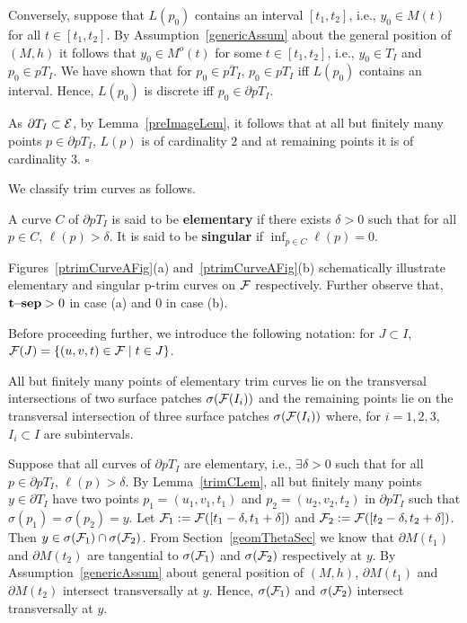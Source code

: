 \documentclass{elsart5p}
\newcommand{\sep}{{\bf t\!\!-\!\!sep}}
\begin{document}
Conversely, suppose that $L(p_0)$ contains an interval $[t_1, t_2]$, i.e., $y_0 \in M(t)$ for all 
$t \in [t_1, t_2]$.  By Assumption~\ref{genericAssum} about the general position of $(M,h)$ it 
follows that $y_0 \in M^o(t)$ for some $t \in [t_1, t_2]$, i.e., $y_0 \in T_I$ and $p_0 \in pT_I$.
We have shown that for $p_0 \in \overline{pT_I}$, $p_0 \in pT_I$ iff $L(p_0)$ contains an interval.  Hence, $L(p_0)$ is discrete iff $p_0 \in \partial pT_I$. 

As $\partial T_I \subset {\cal E}$, 
by Lemma~\ref{preImageLem}, it follows that 
at all but finitely many points $p \in \partial pT_I$,  
$L(p)$ is of cardinality $2$ and at remaining points it is of cardinality $3$. 
\hfill $\square$


We classify trim curves as follows.
\begin{defn} \label{trimCClassifyDef}
A curve $C$ of $\partial pT_I$ is said to be {\bf elementary} if  there exists $\delta > 0$ such that for all 
$p \in C$, $\ell(p) > \delta$. 
It is said to be {\bf singular} if $\displaystyle \inf_{p \in C} \ell(p) = 0$.
\end{defn}

Figures~\ref{ptrimCurveAFig}(a) and~\ref{ptrimCurveAFig}(b) schematically illustrate elementary and singular p-trim curves on ${\cal F}$ respectively.  
Further observe that, $\sep > 0$ in case (a) and 0 in case (b).

Before proceeding further, we introduce the following notation: for 
$J \subset I$, ${\cal F}(J)=\{(u,v,t) \in {\cal F} \mid t \in J\}$.

\begin{lem} \label{transInterLem}
All but finitely many points of elementary trim curves lie on the 
transversal intersections of two surface 
patches $\sigma({\cal F}(I_i))$ and the remaining points lie on the transversal 
intersection of three surface patches $\sigma({\cal F}(I_i))$ 
where, for $i=1,2,3$, $I_i \subset I$ are subintervals.
\end{lem}
  Suppose that all curves of $\partial pT_I$ are elementary, i.e., $\exists \delta >0$ 
such that for all $p \in \partial pT_I$, $\ell (p) > \delta$.
By Lemma~\ref{trimCLem}, 
all but finitely many points $y \in \partial T_I$ have two points $p_1=(u_1, v_1, t_1)$ and 
$p_2= (u_2, v_2, t_2)$ in $\partial pT_I$ such that 
$\sigma(p_1) = \sigma(p_2) = y$.  Let ${\cal F}_1 := {\cal F}([t_1 - \delta, t_1 + \delta])$ 
and  ${\cal F}_2 := {\cal F}([t_2 - \delta, t_2 + \delta])$.  Then 
$y \in \sigma({\cal F}_1) \cap \sigma({\cal F}_2)$.  From Section~\ref{geomThetaSec} we know that 
$\partial M(t_1)$ and $\partial M(t_2)$ are tangential to $\sigma({\cal F}_1)$ and $\sigma({\cal F}_2)$ 
respectively at $y$.  By Assumption~\ref{genericAssum} about general position of $(M,h)$, $\partial M(t_1)$ and 
$\partial M(t_2)$ intersect transversally at $y$.  Hence, $\sigma({\cal F}_1)$ and $\sigma({\cal F}_2) $ intersect 
transversally at $y$.  
\end{document}
